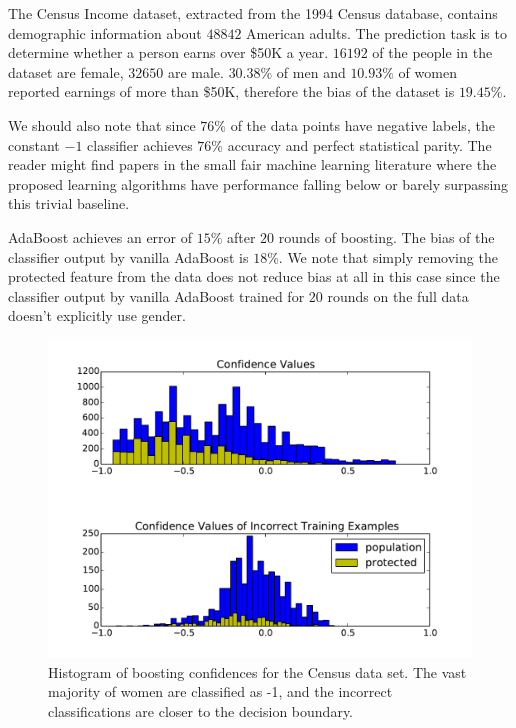\documentclass{article}
\begin{document}
The Census Income dataset, extracted from the 1994 Census database, contains
demographic information about $48842$ American adults.  The prediction task is
to determine whether a person earns over \$50K a year. $16192$ of the people in
the dataset are female, $32650$ are male. $30.38\%$ of men and $10.93\%$ of
women reported earnings of more than \$50K, therefore the bias of the dataset
is $19.45\%$.

We should also note that since $76\%$ of the data points have negative labels,
the constant $-1$ classifier achieves $76\%$ accuracy and perfect statistical parity.
The reader might find papers in the small fair machine learning literature
where the proposed learning algorithms have performance falling below or
barely surpassing this trivial baseline.

AdaBoost achieves an error of $15\%$ after $20$ rounds of boosting.  The bias
of the classifier output by vanilla AdaBoost is $18\%$.  We note that simply
removing the protected feature from the data does not reduce bias at all in
this case since the classifier output by vanilla AdaBoost trained for $20$
rounds on the full data doesn't explicitly use gender.

\begin{figure}[t]
\centering
\includegraphics[width=\columnwidth]{images/censusmargins.pdf}
\caption{Histogram of boosting confidences for the Census data set. The vast
majority of women are classified as -1, and the incorrect classifications are
closer to the decision boundary.}
\label{fig:boosting-margins}
\end{figure}
\end{document}
